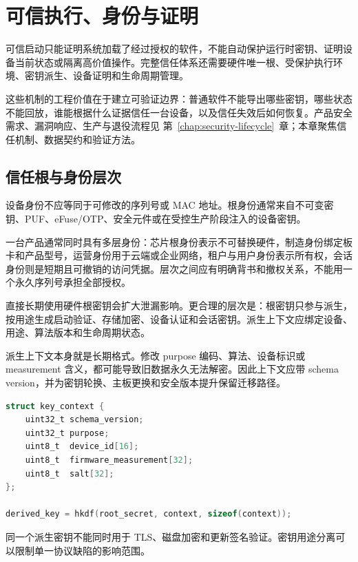 \chapter{可信执行、身份与证明}
\label{chap:trusted-execution-identity}

可信启动只能证明系统加载了经过授权的软件，不能自动保护运行时密钥、证明设备当前状态或隔离高价值操作。完整信任体系还需要硬件唯一根、受保护执行环境、密钥派生、设备证明和生命周期管理。

这些机制的工程价值在于建立可验证边界：普通软件不能导出哪些密钥，哪些状态不能回放，谁能根据什么证据信任一台设备，以及信任失效后如何恢复。产品安全需求、漏洞响应、生产与退役流程见 \mbox{第~\ref{chap:security-lifecycle}~章}；本章聚焦信任机制、数据契约和验证方法。

\section{信任根与身份层次}

设备身份不应等同于可修改的序列号或 MAC 地址。根身份通常来自不可变密钥、PUF、eFuse/OTP、安全元件或在受控生产阶段注入的设备密钥。

一台产品通常同时具有多层身份：芯片根身份表示不可替换硬件，制造身份绑定板卡和产品型号，运营身份用于云端或企业网络，租户与用户身份表示所有权，会话身份则是短期且可撤销的访问凭据。层次之间应有明确背书和撤权关系，不能用一个永久序列号承担全部授权。

直接长期使用硬件根密钥会扩大泄漏影响。更合理的层次是：根密钥只参与派生，按用途生成启动验证、存储加密、设备认证和会话密钥。派生上下文应绑定设备、用途、算法版本和生命周期状态。

派生上下文本身就是长期格式。修改 purpose 编码、算法、设备标识或 measurement 含义，都可能导致旧数据永久无法解密。因此上下文应带 schema version，并为密钥轮换、主板更换和安全版本提升保留迁移路径。

\noindent\begin{minipage}{\textwidth}
\begin{lstlisting}[language=C,caption={用途隔离的密钥派生上下文（示意）}]
struct key_context {
    uint32_t schema_version;
    uint32_t purpose;
    uint8_t  device_id[16];
    uint8_t  firmware_measurement[32];
    uint8_t  salt[32];
};

derived_key = hkdf(root_secret, context, sizeof(context));
\end{lstlisting}
\end{minipage}

同一个派生密钥不能同时用于 TLS、磁盘加密和更新签名验证。密钥用途分离可以限制单一协议缺陷的影响范围。

